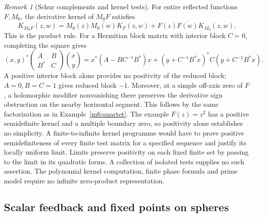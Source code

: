 \documentclass[11pt,reqno]{amsart}
\theoremstyle{definition}
\theoremstyle{remark}
\newtheorem{remark}[theorem]{Remark}
\numberwithin{equation}{section}
\begin{document}
\begin{remark}[Schur complements and kernel tests]\label{m6:kernel-programme}
For entire reflected functions \(F,M_0\), the derivative kernel
of \(M_0F\) satisfies
\[
 K_{M_0 F}(z,w)=M_0(z)\overline{M_0(w)}K_F(z,w)
                  +F(z)\overline{F(w)}K_{M_0}(z,w).
\]
This is the product rule. For a Hermitian block matrix with
interior block \(C\succ0\), completing the square gives
\[
 (x,y)^*
 \begin{pmatrix}A&B\\B^*&C\end{pmatrix}
 \binom{x}{y}
 =x^*(A-BC^{-1}B^*)x+
        (y+C^{-1}B^*x)^*C(y+C^{-1}B^*x).
\]
A positive interior block alone provides no positivity of
the reduced block; \(A=0,B=C=1\) gives reduced block \(-1\).
Moreover, at a simple off-axis zero of \(F\), a holomorphic
modifier nonvanishing there preserves the derivative sign
obstruction on the nearby horizontal segment. This follows by
the same factorization as in Example~\ref{m6:quartet}. The example
\(F(z)=z^2\) has a positive semidefinite kernel and a multiple
boundary zero, so positivity alone establishes no simplicity.
A finite-to-infinite kernel programme would have to prove
positive semidefiniteness of every finite test matrix for a
specified sequence and justify its locally uniform limit. Limits
preserve positivity on each fixed finite set by passing to the
limit in its quadratic forms. A collection of isolated tests
supplies no such assertion. The polynomial kernel computation,
finite phase formula and prime model require no infinite
zero-product representation.
\end{remark}

\subsection{Scalar feedback and fixed points on spheres}
\end{document}
